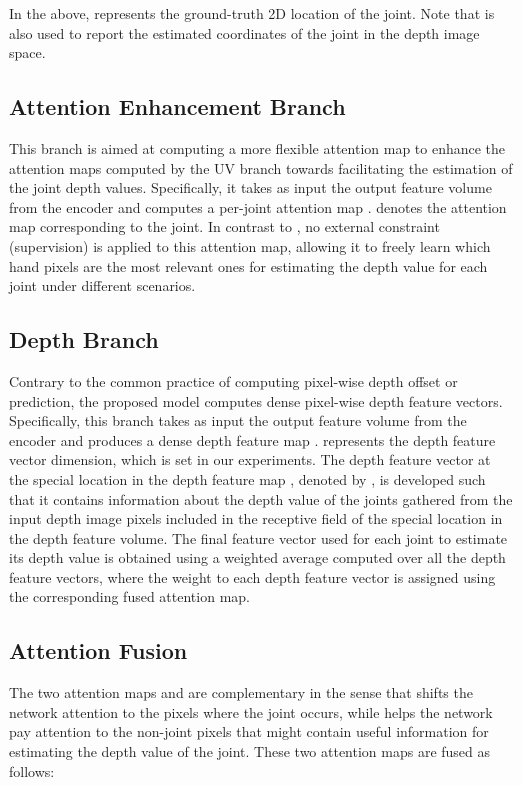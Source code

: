 \documentclass{article}
\begin{document}
In the above,  represents the ground-truth 2D location of the  joint. Note that  is also used to report the estimated coordinates of the  joint in the depth image space. 

\subsection{Attention Enhancement Branch}
This branch is aimed at computing a more flexible attention map to enhance the attention maps computed by the UV branch  towards facilitating the estimation of the joint depth values. Specifically, it takes as input the output feature volume from the encoder and computes a per-joint attention map .  denotes the attention map corresponding to the  joint. In contrast to  , no external constraint (supervision) is applied to this attention map, allowing it to freely learn which hand pixels are the most relevant ones for estimating the depth value for each joint under different scenarios.


\subsection{Depth Branch}
Contrary to the common practice of computing pixel-wise depth offset or prediction, the proposed model computes dense pixel-wise depth feature vectors. Specifically, this branch takes as input the output feature volume from the encoder and produces a dense depth feature map .  represents the depth feature vector dimension, which is set  in our experiments. The depth feature vector at the special location  in the depth feature map , denoted by , is developed such that it contains information about the depth value of the joints gathered from the input depth image pixels included in the receptive field of the special location  in the depth feature volume. The final feature vector used for each joint to estimate its depth value is obtained using a weighted average computed over all the depth feature vectors, where the weight to each depth feature vector is assigned using the corresponding fused attention map.



\subsection{Attention Fusion}
The two attention maps  and  are complementary in the sense that  shifts the network attention to the pixels where the  joint occurs, while  helps the network pay attention to the non-joint pixels that might contain useful information for estimating the depth value of the  joint. These two attention maps are fused as follows:
\end{document}
